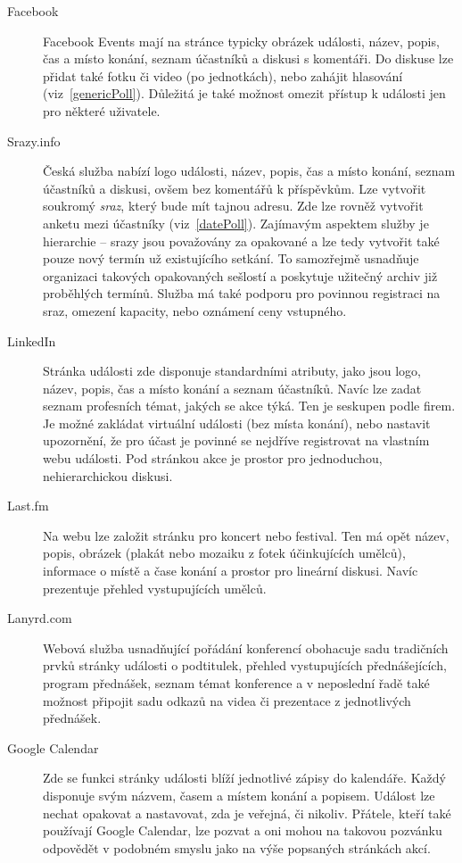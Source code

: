 \documentclass[12pt,oneside,final]{fithesis2}
\begin{document}
\begin{description}
    \item[Facebook]
        Facebook Events mají na stránce typicky obrázek události, název, popis, čas a místo konání, seznam účastníků a diskusi s komentáři. Do diskuse lze přidat také fotku či video (po jednotkách), nebo zahájit hlasování (viz~\ref{genericPoll}). Důležitá je také možnost omezit přístup k události jen pro některé uživatele.

    \item[Srazy.info]
        Česká služba nabízí logo události, název, popis, čas a místo konání, seznam účastníků a diskusi, ovšem bez komentářů k příspěvkům. Lze vytvořit soukromý \emph{sraz}, který bude mít tajnou adresu. Zde lze rovněž vytvořit anketu mezi účastníky (viz~\ref{datePoll}). Zajímavým aspektem služby je hierarchie -- srazy jsou považovány za opakované a lze tedy vytvořit také pouze nový termín už existujícího setkání. To samozřejmě usnadňuje organizaci takových opakovaných sešlostí a poskytuje užitečný archiv již proběhlých termínů. Služba má také podporu pro povinnou registraci na sraz, omezení kapacity, nebo oznámení ceny vstupného.

    \item[LinkedIn]
        Stránka události zde disponuje standardními atributy, jako jsou logo, název, popis, čas a místo konání a seznam účastníků. Navíc lze zadat seznam profesních témat, jakých se akce týká. Ten je seskupen podle firem. Je možné zakládat virtuální události (bez místa konání), nebo nastavit upozornění, že pro účast je povinné se nejdříve registrovat na vlastním webu události. Pod stránkou akce je prostor pro jednoduchou, nehierarchickou diskusi.

    \item[Last.fm]
        Na webu lze založit stránku pro koncert nebo festival. Ten má opět název, popis, obrázek (plakát nebo mozaiku z fotek účinkujících umělců), informace o místě a čase konání a prostor pro lineární diskusi. Navíc prezentuje přehled vystupujících umělců.

    \item[Lanyrd.com]
        Webová služba usnadňující pořádání konferencí obohacuje sadu tradičních prvků stránky události o podtitulek, přehled vystupujících přednášejících, program přednášek, seznam témat konference a v neposlední řadě také možnost připojit sadu odkazů na videa či prezentace z jednotlivých přednášek.

    \item[Google Calendar]
        Zde se funkci stránky události blíží jednotlivé zápisy do kalendáře. Každý disponuje svým názvem, časem a místem konání a popisem. Událost lze nechat opakovat a nastavovat, zda je veřejná, či nikoliv. Přátele, kteří také používají Google Calendar, lze pozvat a oni mohou na takovou pozvánku odpovědět v podobném smyslu jako na výše popsaných stránkách akcí.
\end{description}
\end{document}

